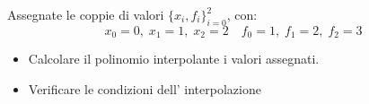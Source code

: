 Assegnate le coppie di valori $\{x_i,f_i \}_{i=0}^2$, con:
\[ x_0=0, \; x_1=1, \; x_2=2 \quad f_0=1, \; f_1=2, \; f_2=3 \]
\begin{itemize}
\item Calcolare il polinomio interpolante i
valori assegnati.
\item Verificare le condizioni dell' interpolazione
\end{itemize}
